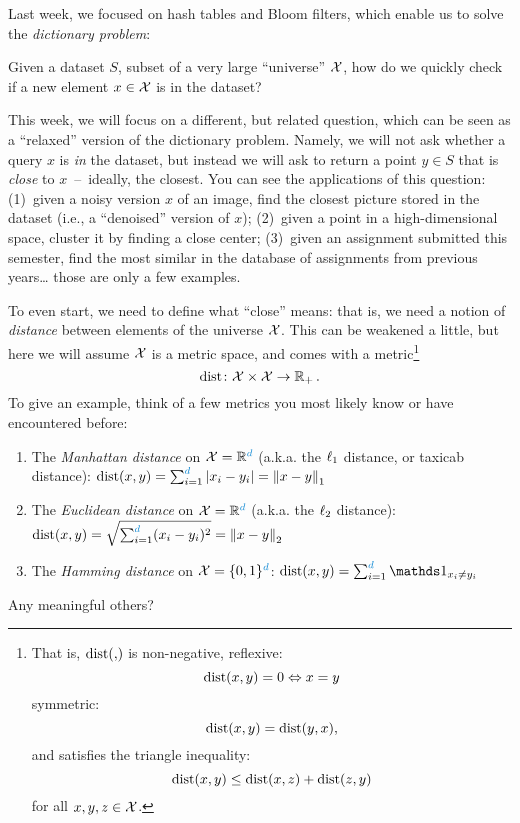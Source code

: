Last week, we focused on hash tables and Bloom filters, which enable us to solve the \emph{dictionary problem}:
\begin{framed}
    Given a dataset $S$, subset of a very large ``universe'' $\cX$, how do we quickly check if a new element $x\in\cX$ is in the dataset?
\end{framed}
This week, we will focus on a different, but related question, which can be seen as a ``relaxed'' version of the dictionary problem. Namely, we will not ask whether a query $x$ is \emph{in} the dataset, but instead we will ask to return a point $y\in S$ that is \emph{close} to $x$~--~ideally, the closest. You can see the applications of this question: (1)~given a noisy version $x$ of an image, find the closest picture stored in the dataset (i.e., a ``denoised'' version of $x$); (2)~given a point in a high-dimensional space, cluster it by finding a close center; (3)~given an assignment submitted this semester, find the most similar in the database of assignments from previous years\dots{} those are only a few examples. 

To even start, we need to define what ``close'' means: that is, we need a notion of \emph{distance} between elements of the universe $\cX$. This can be weakened a little, but here we will assume $\cX$ is a metric space, and comes with a metric\footnote{That is, $\dist{}{}$ is non-negative,
reflexive:
\[
\dist{x}{y} = 0 \Leftrightarrow x=y
\]
symmetric:
\[
\dist{x}{y} = \dist{y}{x},
\]
and satisfies the triangle inequality:
\[
\dist{x}{y} \leq \dist{x}{z}+\dist{z}{y}
\]
for all $x,y,z\in\cX$.
}
\[
\operatorname{dist}\colon \cX\times\cX \to \R_+\,.
\]
To give an example, think of a few metrics you most likely know or have encountered before:
\begin{enumerate}
    \item The \emph{Manhattan distance} on $\cX=\R^\dims$ (a.k.a. the $\lp[1]$ distance, or taxicab distance): $\dist{x}{y} = \sum_{i=1}^\dims \abs{x_i-y_i} = \normone{x-y}$
    \item The \emph{Euclidean distance} on $\cX=\R^\dims$ (a.k.a. the $\lp[2]$ distance): $\dist{x}{y} = \sqrt{\sum_{i=1}^\dims (x_i-y_i)^2} = \normtwo{x-y}$
    \item The \emph{Hamming distance} on $\cX=\bool^\dims$: $\dist{x}{y} = \sum_{i=1}^\dims \indicSet{x_i \neq y_i}$
\end{enumerate}
Any meaningful others?

